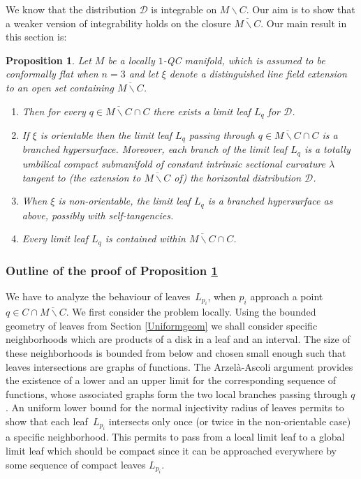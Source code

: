 \documentclass[10pt]{amsart}
\let\mathcal\mathscr
\let\moins\smallsetminus
\newtheorem{proposition}[theorem]{Proposition}
\theoremstyle{definition}
\theoremstyle{remark}
\numberwithin{equation}{section}
\begin{document}
We know that the distribution $\mathcal D$ is integrable on $M\moins C$. Our aim is to show that a weaker version of integrability
holds on the closure $\overline{M\moins C}$. Our main result in this section is:

\begin{proposition}\label{integrability}
Let $M$ be a locally $1$-QC manifold, which is assumed to be conformally flat when $n=3$ and let $\xi$ denote a distinguished line field extension to an open set containing $\overline{M\moins C}$.
\begin{enumerate}
\item Then for every $q\in \overline{M\moins C}\cap C$ there exists a limit leaf $L_q$ for $\mathcal D$.
\item If $\xi$ is orientable then the limit leaf $L_q$ passing through $q\in \overline{M\moins C}\cap C$
is a branched hypersurface. Moreover, each branch of the limit leaf $L_q$ is a totally umbilical compact submanifold of constant
intrinsic sectional curvature $\lambda$ tangent to (the extension to $\overline{M\moins C}$ of) the horizontal distribution
$\mathcal D$.
\item When $\xi$ is non-orientable, the limit leaf $L_q$ is a branched hypersurface
as above, possibly with self-tangencies.
\item Every limit leaf $L_q$ is contained within $ \overline{M\moins C}\cap C$.
\end{enumerate}
\end{proposition}

\subsubsection*{Outline of the proof of Proposition \ref{integrability}}
We have to analyze the behaviour of leaves~$L_{p_i}$, when $p_i$ approach
a point $q\in C\cap \overline{M\moins C}$. We first consider the problem locally. Using the bounded geometry of leaves from Section \ref{Uniformgeom}
we shall consider specific neighborhoods which are products of a disk in a leaf and an interval. The size of these neighborhoods is bounded from below and chosen small enough such that leaves intersections are graphs of functions. The Arzelà-Ascoli argument provides the existence
of a lower and an upper limit for the corresponding sequence of functions, whose associated graphs form the two local branches passing through
$q$. An uniform lower bound for the normal injectivity radius of leaves permits to show that each leaf~$L_{p_i}$ intersects only once (or twice in the non-orientable case) a specific \hbox{neighborhood}. This permits to pass from a local limit leaf to a global
limit leaf which should be compact since it can be approached everywhere by some sequence of compact leaves $L_{p_i}$.
\end{document}
